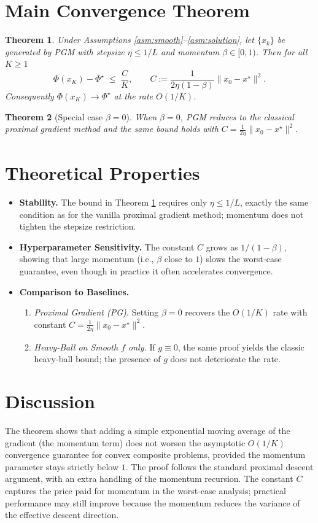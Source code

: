 \documentclass{article}
\newtheorem{theorem}{Theorem}
\begin{document}
\section*{Main Convergence Theorem}
\begin{theorem}\label{thm:rate}
Under Assumptions \ref{asm:smooth}–\ref{asm:solution}, let $\{x_{k}\}$ be generated by PGM with stepsize $\eta\le 1/L$ and momentum $\beta\in[0,1)$. Then for all $K\ge 1$
\[
\Phi(x_{K})-\Phi^{\star}\;\le\;\frac{C}{K},
\qquad 
C:=\frac{1}{2\eta(1-\beta)}\|x_{0}-x^{\star}\|^{2}.
\]
Consequently $\Phi(x_{K})\to\Phi^{\star}$ at the rate $O(1/K)$.
\end{theorem}
\begin{theorem}[Special case $\beta=0$]\label{thm:beta0}
When $\beta=0$, PGM reduces to the classical proximal gradient method and the same bound holds with $C=\frac{1}{2\eta}\|x_{0}-x^{\star}\|^{2}$.
\end{theorem}

\section*{Theoretical Properties}
\begin{itemize}
\item \textbf{Stability.} The bound in Theorem \ref{thm:rate} requires only $\eta\le 1/L$, exactly the same condition as for the vanilla proximal gradient method; momentum does not tighten the stepsize restriction.
\item \textbf{Hyperparameter Sensitivity.} The constant $C$ grows as $1/(1-\beta)$, showing that large momentum (i.e., $\beta$ close to $1$) slows the worst‑case guarantee, even though in practice it often accelerates convergence.
\item \textbf{Comparison to Baselines.} 
   \begin{enumerate}
   \item \emph{Proximal Gradient (PG).} Setting $\beta=0$ recovers the $O(1/K)$ rate with constant $C= \frac{1}{2\eta}\|x_{0}-x^{\star}\|^{2}$.
   \item \emph{Heavy‑Ball on Smooth $f$ only.} If $g\equiv0$, the same proof yields the classic heavy‑ball bound; the presence of $g$ does not deteriorate the rate.
   \end{enumerate}
\end{itemize}

\section*{Discussion}
The theorem shows that adding a simple exponential moving average of the gradient (the momentum term) does not worsen the asymptotic $O(1/K)$ convergence guarantee for convex composite problems, provided the momentum parameter stays strictly below $1$. The proof follows the standard proximal descent argument, with an extra handling of the momentum recursion. The constant $C$ captures the price paid for momentum in the worst‑case analysis; practical performance may still improve because the momentum reduces the variance of the effective descent direction.
\end{document}
